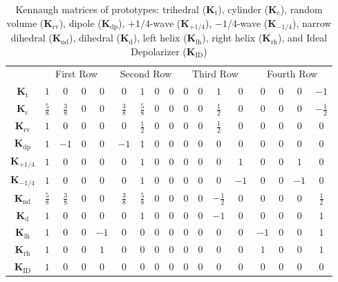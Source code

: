 \documentclass[journal]{IEEEtran}
\begin{document}
	\begin{table}[hbt]
		\centering
		\caption{Kennaugh matrices of prototypes: {trihedral} ($\bm{K}_{\text{t}}$),
			{cylinder} ($\bm{K}_{\text{c}}$),
			{random volume} ($\bm{K}_{\text{rv}}$),
			{dipole} ($\bm{K}_{\text{dp}}$),
			{$+1/4$-wave} ($\bm{K}_{+1/4}$), 
			{$-1/4$-wave} ($\bm{K}_{-1/4}$),
			{narrow dihedral} ($\bm{K}_{\text{nd}}$),
			{dihedral} ($\bm{K}_{\text{d}}$),
			{left helix} ($\bm{K}_{\text{lh}}$), 
			{right helix} ($\bm{K}_{\text{rh}}$), 
			and Ideal Depolarizer ($\bm{K}_{\text{ID}}$)}\label{Tab:ElementaryK}
		\setlength{\tabcolsep}{2.7pt}
		\renewcommand{\arraystretch}{1.3}
		\begin{tabular}{*{17}{c}}\toprule
			&    \multicolumn{4}{c}{First Row} 
			& \multicolumn{4}{c}{Second Row} 
			& \multicolumn{4}{c}{Third Row} 
			& \multicolumn{4}{c}{Fourth Row}\\ 
			\cmidrule(rl){2-5} \cmidrule(rl){6-9} \cmidrule(rl){10-13} \cmidrule(rl){14-17} 
			$\bm K_{\text{t}}$
			& $1$ & $0$ & $0$ & $0$
			& $0$ & $1$ & $0$ & $0$
			& $0$ & $0$ & $1$ & $0$
			& $0$ & $0$ & $0$ & $-1$ \\
			$\bm K_{\text{c}}$
			& $\frac{5}{8}$ & $\frac{3}{8}$ & $0$ & $0$
			& $\frac{3}{8}$ & $\frac{5}{8}$ & $0$ & $0$
			& $0$ & $0$ & $\frac{1}{2}$ & $0$
			& $0$ & $0$ & $0$ & $-\frac{1}{2}$\\
			$\bm K_{\text{rv}}$ 
			& $1$ & $0$ & $0$ & $0$
			& $0$ & $\frac{1}{2}$ & $0$ & $0$
			& $0$ & $0$ & $\frac{1}{2}$ & $0$
			& $0$ & $0$ & $0$ & $0$\\
			$\bm K_\text{dp}$
			& $1$ & $-1$ & $0$ & $0$
			& $-1$ & $1$ & $0$ & $0$
			& $0$ & $0$ & $0$ & $0$
			& $0$ & $0$ & $0$ & $0$\\
			$\bm K_{+1/4}$
			& $1$ & $0$ & $0$ & $0$
			& $0$ & $1$ & $0$ & $0$
			& $0$ & $0$ & $0$ & $1$
			& $0$ & $0$ & $1$ & $0$\\
			$\bm K_{-1/4}$
			& $1$ & $0$ & $0$ & $0$
			& $0$ & $1$ & $0$ & $0$
			& $0$ & $0$ & $0$ & $-1$
			& $0$ & $0$ & $-1$ & $0$\\
			$\bm K_{\text{nd}}$ 
			&$\frac{5}{8}$ & $\frac{3}{8}$ & $0$ & $0$
			& $\frac{3}{8}$ & $\frac{5}{8}$ & $0$ & $0$
			& $0$ & $0$ & $-\frac{1}{2}$ & $0$
			& $0$ & $0$ & $0$ & $\frac{1}{2}$\\
			$\bm K_{\text{d}}$ &
			$1$ & $0$ & $0$ & $0$
			& $0$ & $1$ & $0$ & $0$
			& $0$ & $0$ & $-1$ & $0$
			& $0$ & $0$ & $0$ & $1$ \\
			$ \bm K_{\text{lh}}$
			& $1$ & $0$ & $0$ & $-1$
			& $0$ & $0$ & $0$ & $0$
			& $0$ & $0$ & $0$ & $0$
			& $-1$ & $0$ & $0$ & $1$\\
			$ \bm K_{\text{rh}}$
			& $1$ & $0$ & $0$ & $1$
			& $0$ & $0$ & $0$ & $0$
			& $0$ & $0$ & $0$ & $0$
			& $1$ & $0$ & $0$ & $1$\\
			$\bm{K}_{\text{ID}}$
			& $1$ & $0$ & $0$ & $0$
			& $0$ & $0$ & $0$ & $0$
			& $0$ & $0$ & $0$ & $0$
			& $0$ & $0$ & $0$ & $0$ \\
			\bottomrule
		\end{tabular}
	\end{table}
	
\end{document}
